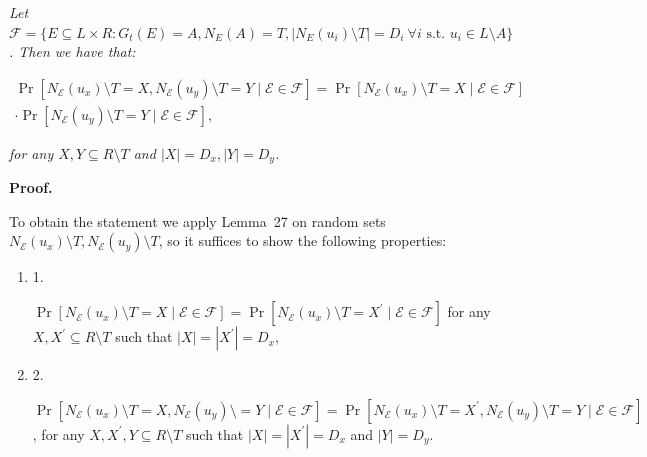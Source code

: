 \emph{Let $\mathscr{F}=\{E\subseteq L\times R:G_{t}(E)=A,N_{E}(A)=T,|N_{E}(u_{i})\setminus T|=D_{i}\ \forall i\text{ s.t. }u_{i}\in L\setminus A\}$.
Then we have that:}\par


\[\begin{gathered}
\displaystyle\Pr[N_{\mathcal{E}}(u_{x})\setminus T=X,N_{\mathcal{E}}(u_{y})\setminus T=Y\mid\mathcal{E}\in\mathscr{F}]= \displaystyle\Pr[N_{\mathcal{E}}(u_{x})\setminus T=X\mid\mathcal{E}\in\mathscr{F}] \\
\displaystyle\cdot\Pr[N_{\mathcal{E}}(u_{y})\setminus T=Y\mid\mathcal{E}\in\mathscr{F}],
\end{gathered}\]


\emph{for any $X,Y\subseteq R\setminus T$ and $|X|=D_{x},|Y|=D_{y}$.}\par






\par\medskip\noindent\textbf{Proof.}\par



To obtain the statement we apply Lemma 27 on random sets $N_{\mathcal{E}}(u_{x})\setminus T,N_{\mathcal{E}}(u_{y})\setminus T$, so it suffices to show the following properties:\par


\begin{enumerate}


\item[] 1. 


$\Pr[N_{\mathcal{E}}(u_{x})\setminus T=X\mid\mathcal{E}\in\mathscr{F}]=\Pr[N_{\mathcal{E}}(u_{x})\setminus T=X^{\prime}\mid\mathcal{E}\in\mathscr{F}]$ for any $X,X^{\prime}\subseteq R\setminus T$ such that $|X|=|X^{\prime}|=D_{x}$,\par




\item[] 2. 


$\Pr[N_{\mathcal{E}}(u_{x})\setminus T=X,N_{\mathcal{E}}(u_{y})\setminus=Y\mid\mathcal{E}\in\mathscr{F}]=\Pr[N_{\mathcal{E}}(u_{x})\setminus T=X^{\prime},N_{\mathcal{E}}(u_{y})\setminus T=Y\mid\mathcal{E}\in\mathscr{F}]$, for any $X,X^{\prime},Y\subseteq R\setminus T$ such that $|X|=|X^{\prime}|=D_{x}$ and $|Y|=D_{y}$.\par




\end{enumerate}


